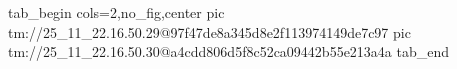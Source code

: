  
 
 
 
 

\qqSecOrig


\ifcmt
  tab_begin cols=2,no_fig,center
    pic tm://25_11_22.16.50.29@97f47de8a345d8e2f113974149de7c97
    pic tm://25_11_22.16.50.30@a4cdd806d5f8c52ca09442b55e213a4a
  tab_end
\fi

